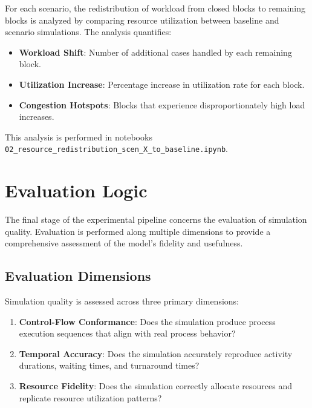         For each scenario, the redistribution of workload from closed blocks to remaining blocks is analyzed by comparing resource utilization between baseline and scenario simulations. The analysis quantifies:
        
        \begin{itemize}
            \item \textbf{Workload Shift}: Number of additional cases handled by each remaining block.
            \item \textbf{Utilization Increase}: Percentage increase in utilization rate for each block.
            \item \textbf{Congestion Hotspots}: Blocks that experience disproportionately high load increases.
        \end{itemize}
        
        This analysis is performed in notebooks \texttt{02\_resource\_redistribution\_scen\_X\_to\_baseline.ipynb}.


\section{Evaluation Logic}

The final stage of the experimental pipeline concerns the evaluation of simulation quality. Evaluation is performed along multiple dimensions to provide a comprehensive assessment of the model's fidelity and usefulness.

    \subsection{Evaluation Dimensions}
    
    Simulation quality is assessed across three primary dimensions:
    
    \begin{enumerate}
        \item \textbf{Control-Flow Conformance}: Does the simulation produce process execution sequences that align with real process behavior?
        \item \textbf{Temporal Accuracy}: Does the simulation accurately reproduce activity durations, waiting times, and turnaround times?
        \item \textbf{Resource Fidelity}: Does the simulation correctly allocate resources and replicate resource utilization patterns?
    \end{enumerate}

